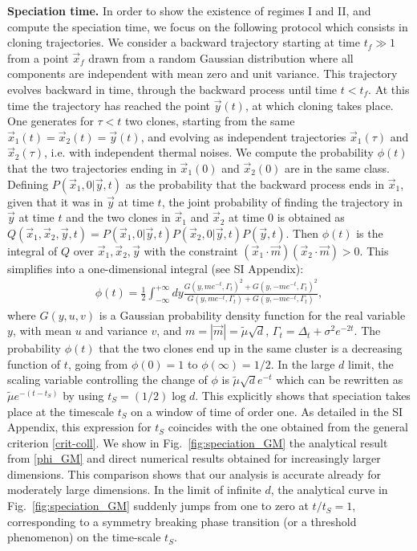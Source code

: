\documentclass[10pt,twocolumn]{article}
\begin{document}
{\bf Speciation time.} In order to show the existence of regimes I and II, and compute the speciation time, we focus on the following protocol which consists in cloning trajectories. We consider a backward trajectory starting at time $t_f\gg 1$ from a point $\vec x_f$ drawn from a random Gaussian distribution where all components are independent with mean zero and unit variance. This trajectory evolves backward in time, through the backward process until time $t<t_f$. At this time the trajectory has reached the point $\vec y(t)$, at which cloning takes place. 
One generates for $\tau<t$ two clones, starting from the same $\vec x_1(t)=\vec x_2(t) = \vec y(t)$, and evolving as independent trajectories $\vec x_1(\tau)$ and $\vec x_2(\tau)$, i.e. with independent thermal noises. We compute the probability $\phi(t)$ that the two trajectories ending in $\vec x_1(0)$ and $\vec x_2(0)$ are in the same class. Defining $P(\vec x_1, 0|\vec y,t)$ as the probability that the backward process ends in $\vec x_1$, given that it was in $\vec y$ at time $t$,  the joint probability of finding the trajectory in $\vec y$ at time $t$ and the two clones in $\vec x_1$ and $\vec x_2$ at time 0 is obtained as $Q(\vec x_1,\vec x_2,\vec y,t)=P(\vec x_1, 0|\vec y,t)P(\vec x_2, 0|\vec y,t)P(\vec y,t)$. Then $\phi(t)$ is the integral of $Q$ over $\vec x_1,\vec x_2,\vec y$ with the constraint $(\vec x_1 \cdot \vec m)(\vec x_2 \cdot \vec m) >0$. This simplifies into a one-dimensional integral (see SI Appendix):
\begin{align} \label{phi_GM}
\phi(t)=\frac{1}{2} \int_{-\infty}^{+\infty} dy \frac{G(y,m e^{-t},\Gamma_t)^2+G(y,-m e^{-t},\Gamma_t)^2 }{G(y,m e^{-t},\Gamma_t)+G(y,-m e^{-t},\Gamma_t)},
\end{align}
where $G(y,u,v)$ is a Gaussian probability density function for the real variable $y$, with mean  $u$ and variance $v$, and $m=|\vec m|=\tilde \mu \sqrt{d}$, $\Gamma_t= \Delta_t+\sigma^2 e^{-2t}$. The probability $\phi(t)$ that the two clones end up in the same cluster is a decreasing function of $t$, going from $\phi(0)=1$ to $\phi(\infty)=1/2$. In the large $d$ limit, the scaling variable controlling the change of $\phi$ is $\tilde \mu \sqrt{d}e^{-t}$ which can be rewritten as $\tilde \mu e^{-(t-t_S)}$ by using $t_S=(1/2)\log d$. This explicitly shows that speciation takes place at the timescale $t_S$ on a window of time of order one. As detailed in the SI Appendix, this expression for $t_S$ coincides with the one obtained from the general criterion \eqref{crit-coll}. We show in Fig.~\ref{fig:speciation_GM} the analytical result from \eqref{phi_GM} and direct numerical results obtained for increasingly larger dimensions. This comparison shows that our analysis is accurate already for moderately large dimensions. In the limit of infinite $d$, the analytical curve in Fig.~\ref{fig:speciation_GM} suddenly jumps from one to zero at $t/t_S=1$, corresponding to a symmetry breaking phase transition (or a threshold phenomenon) on the time-scale $t_S$. 
\end{document}

